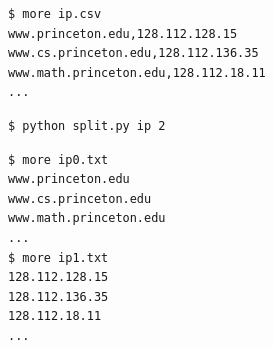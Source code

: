 \documentclass[8pt,a4paper,compress]{beamer}
\begin{document}
\begin{frame}[fragile]
\pause

\begin{lstlisting}[language={}]
$ more ip.csv 
www.princeton.edu,128.112.128.15
www.cs.princeton.edu,128.112.136.35
www.math.princeton.edu,128.112.18.11
...
\end{lstlisting}

\pause

\begin{lstlisting}[language={}]
$ python split.py ip 2
\end{lstlisting}

\pause

\begin{lstlisting}[language={}]
$ more ip0.txt
www.princeton.edu
www.cs.princeton.edu
www.math.princeton.edu
...
$ more ip1.txt
128.112.128.15
128.112.136.35
128.112.18.11
...
\end{lstlisting}
\end{frame}
\end{document}
